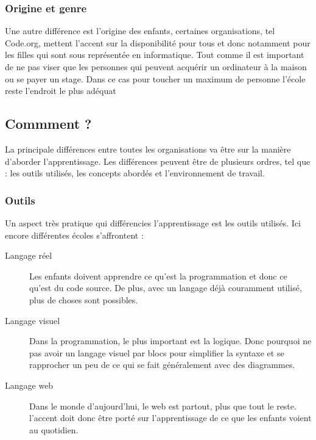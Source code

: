 \subsubsection{Origine et genre}
Une autre différence est l'origine des enfants, certaines organisations, tel Code.org, mettent l'accent sur la disponibilité pour tous et donc notamment pour les filles qui sont sous représentée en informatique. Tout comme il est important de ne pas viser que les personnes qui peuvent acquérir un ordinateur à la maison ou se payer un stage. Dans ce cas pour toucher un maximum de personne l'école reste l'endroit le plus adéquat

\subsection{Commment ?}
La principale différences entre toutes les organisations va être sur la manière d'aborder l'apprentissage. Les différences peuvent être de plusieurs ordres, tel que : les outils utilisés, les concepts abordés et l'environnement de travail.

\subsubsection{Outils} 
Un aspect très pratique qui différencies l'apprentissage est les outils utilisés. Ici encore différentes écoles s'affrontent :
\begin{description}
  \item[Langage réel] Les enfants doivent apprendre ce qu'est la programmation et donc ce qu'est du code source. De plus, avec un langage déjà couramment utilisé, plus de choses sont possibles.
  \item[Langage visuel] Dans la programmation, le plus important est la logique. Donc pourquoi ne pas avoir un langage visuel par blocs pour simplifier la syntaxe et se rapprocher un peu de ce qui se fait généralement avec des diagrammes.
  \item[Langage web] Dans le monde d'aujourd'hui, le web est partout, plus que tout le reste. l'accent doit donc être porté sur l'apprentissage de ce que les enfants voient au quotidien.
\end{description}

